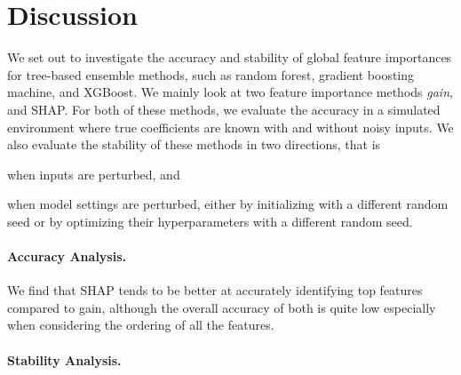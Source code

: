 \vspace{-.2cm}
\section{Discussion} \label{sec:discussion}
\vspace{-.2cm}
We set out to investigate the accuracy and stability of global feature importances for tree-based ensemble methods, such as random forest, gradient boosting machine, and XGBoost. We mainly look at two feature importance methods \emph{gain}, and SHAP. For both of these methods, we evaluate the accuracy in a simulated environment where true coefficients are known with and without noisy inputs. We also evaluate the stability of these methods in two directions, that is
 \begin{enumerate*}
    \item when inputs are perturbed, and
    \item when model settings are perturbed, either by initializing with a different random seed or by optimizing their hyperparameters with a different random seed.
\end{enumerate*}

\paragraph{Accuracy Analysis.} We find that SHAP tends to be better at accurately identifying top features compared to gain, although the overall accuracy of both is quite low especially when considering the ordering of all the features. 

\paragraph{Stability Analysis.} 


